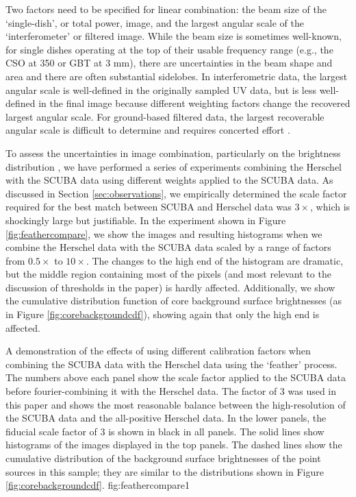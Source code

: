 \documentclass[twocolumn]{aastex61}
\begin{document}
Two factors need to be specified for linear combination: the beam size of the
`single-dish', or total power, image, and the largest angular scale of the
`interferometer' or filtered image.  While the beam size is sometimes
well-known, for single dishes operating at the top of their usable frequency
range (e.g., the CSO at 350 \um or GBT at 3 mm), there are uncertainties in the
beam shape and area and there are often substantial sidelobes.  In
interferometric data, the largest angular scale is well-defined in the
originally sampled UV data, but is less well-defined in the final image because
different weighting factors change the recovered largest angular scale.  For
ground-based filtered data, the largest recoverable angular scale is difficult
to determine and requires concerted effort
\citep[e.g.,][]{Ginsburg2013a,Chapin2013a}.

To assess the uncertainties in image combination, particularly on the
brightness distribution \citep[e.g.][]{Ossenkopf-Okada2016a}, we have performed
a series of experiments combining the Herschel with the SCUBA data using
different weights applied to the SCUBA data.  As discussed in Section
\ref{sec:observations}, we empirically determined the scale factor required for
the best match between SCUBA and Herschel data was $3\times$, which is
shockingly large but justifiable.  In the experiment shown in Figure
\ref{fig:feathercompare}, we show the images and resulting histograms when we
combine the Herschel data with the SCUBA data scaled by a range of factors from
$0.5\times$ to $10\times$.  The changes to the high end of the histogram are
dramatic, but the middle region containing most of the pixels (and most
relevant to the discussion of thresholds in the paper) is hardly affected.
Additionally, we show the cumulative distribution function of core background
surface brightnesses (as in Figure \ref{fig:corebackgroundcdf}), showing again
that only the high end is affected. 

{A demonstration of the effects of using different calibration factors when
combining the SCUBA data with the Herschel data using the `feather' process.
The numbers above each panel show the scale factor applied to the SCUBA data
before fourier-combining it with the Herschel data.  The factor of 3 was used
in this paper and shows the most reasonable balance between the high-resolution
of the SCUBA data and the all-positive Herschel data.  In the lower panels, the
fiducial scale factor of 3 is shown in black in all panels.  The solid lines
show histograms of the images displayed in the top panels.  The dashed lines
show the cumulative distribution of the background surface brightnesses of the
point sources in this sample; they are similar to the distributions shown in
Figure \ref{fig:corebackgroundcdf}.}
{fig:feathercompare}{1}{\textwidth}
\end{document}

